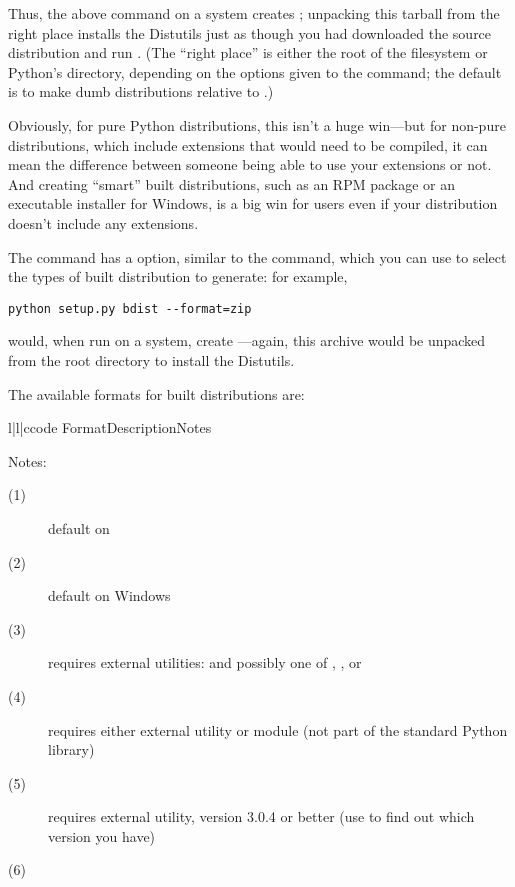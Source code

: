 \documentclass{howto}
\begin{document}
Thus, the above command on a \UNIX{} system creates
; unpacking this tarball
from the right place installs the Distutils just as though you had
downloaded the source distribution and run .  (The ``right place'' is either the root of the filesystem or 
Python's  directory, depending on the options given to
the  command; the default is to make dumb
distributions relative to .)  

Obviously, for pure Python distributions, this isn't a huge win---but
for non-pure distributions, which include extensions that would need to
be compiled, it can mean the difference between someone being able to
use your extensions or not.  And creating ``smart'' built distributions,
such as an RPM package or an executable installer for Windows, is a big
win for users even if your distribution doesn't include any extensions.

The  command has a  option,
similar to the  command, which you can use to select the
types of built distribution to generate: for example,
\begin{verbatim}
python setup.py bdist --format=zip
\end{verbatim}
would, when run on a \UNIX{} system, create
---again, this archive would be
unpacked from the root directory to install the Distutils.

The available formats for built distributions are:
\begin{tableiii}{l|l|c}{code}%
  {Format}{Description}{Notes}
\end{tableiii}

\noindent Notes:
\begin{description}
\item[(1)] default on \UNIX
\item[(2)] default on Windows 
\item[(3)] requires external utilities:  and possibly one
  of , , or 
\item[(4)] requires either external  utility or
   module (not part of the standard Python library)
\item[(5)] requires external  utility, version 3.0.4 or
  better (use  to find out which version you have)
\item[(6)] 
\end{description}
\end{document}
